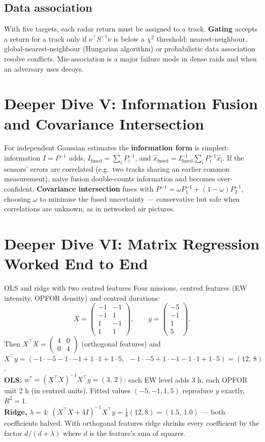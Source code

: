 \documentclass[11pt]{article}
\begin{document}
\subsection{Data association}
With five targets, each radar return must be assigned to a track. \textbf{Gating} accepts a return for a track only if $\nu^\top S^{-1}\nu$ is below a $\chi^2$ threshold; nearest-neighbour, global-nearest-neighbour (Hungarian algorithm) or probabilistic data association resolve conflicts. Mis-association is a major failure mode in dense raids and when an adversary uses decoys.

\section{Deeper Dive V: Information Fusion and Covariance Intersection}
For independent Gaussian estimates the \textbf{information form} is simplest: information $I=P^{-1}$ adds, $I_{\text{fused}}=\sum_iP_i^{-1}$, and $\hat x_{\text{fused}}=I_{\text{fused}}^{-1}\sum_iP_i^{-1}\hat x_i$. If the sensors' errors are correlated (e.g.\ two tracks sharing an earlier common measurement), naive fusion double-counts information and becomes over-confident. \textbf{Covariance intersection} fuses with $P^{-1}=\omega P_1^{-1}+(1-\omega)P_2^{-1}$, choosing $\omega$ to minimise the fused uncertainty --- conservative but safe when correlations are unknown, as in networked air pictures.

\section{Deeper Dive VI: Matrix Regression Worked End to End}
\begin{example}{OLS and ridge with two centred features}
Four missions, centred features (EW intensity, OPFOR density) and centred durations:
\[X=\begin{pmatrix}-1&-1\\-1&1\\1&-1\\1&1\end{pmatrix},\qquad y=\begin{pmatrix}-5\\-1\\1\\5\end{pmatrix}.\]
Then $X^\top X=\begin{pmatrix}4&0\\0&4\end{pmatrix}$ (orthogonal features) and $X^\top y=(-1\cdot-5-1\cdot-1+1\cdot1+1\cdot5,\ \ -1\cdot-5+1\cdot-1-1\cdot1+1\cdot5)=(12,\,8)$.\\
\textbf{OLS:} $w^*=(X^\top X)^{-1}X^\top y=(3,\,2)$: each EW level adds 3 h, each OPFOR unit 2 h (in centred units). Fitted values $(-5,-1,1,5)$ reproduce $y$ exactly, $R^2=1$.\\
\textbf{Ridge,} $\lambda=4$: $(X^\top X+4I)^{-1}X^\top y=\tfrac18(12,8)=(1.5,\,1.0)$ --- both coefficients halved. With orthogonal features ridge shrinks every coefficient by the factor $d/(d+\lambda)$ where $d$ is the feature's sum of squares.
\end{example}
\end{document}
